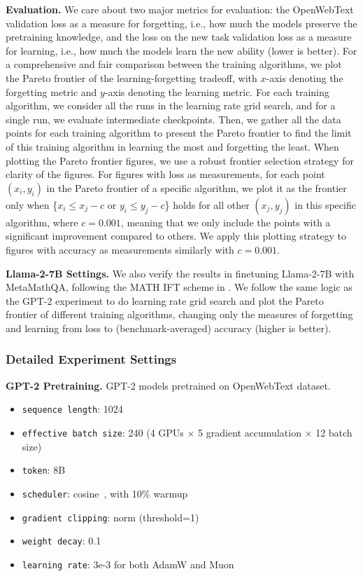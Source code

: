 \documentclass{article}
\theoremstyle{remark}
\begin{document}
\textbf{Evaluation.} We care about two major metrics for evaluation: the OpenWebText validation loss as a measure for forgetting, i.e., how much the models preserve the pretraining knowledge, and the loss on the new task validation loss as a measure for learning, i.e., how much the models learn the new ability (lower is better). 
For a comprehensive and fair comparison between the training algorithms, we plot the Pareto frontier of the learning-forgetting tradeoff, with $x$-axis denoting the forgetting metric and $y$-axis denoting the learning metric. 
For each training algorithm, we consider all the runs in the learning rate grid search, and for a single run, we evaluate intermediate checkpoints. Then, we gather all the data points for each training algorithm to present the Pareto frontier to find the limit of this training algorithm in learning the most and forgetting the least.
When plotting the Pareto frontier figures, we use a robust frontier selection strategy for clarity of the figures. For figures with loss as measurements, for each point $(x_i,y_i)$ in the Pareto frontier of a specific algorithm, we plot it as the frontier only when 
\{$x_i \le x_j - c$ or $y_i \le y_j - c$\}
holds for all other $(x_j,y_j)$ in this specific algorithm, where $c=0.001$, meaning that we only include the points with a significant improvement compared to others. We apply this plotting strategy to figures with accuracy as measurements similarly with $c=0.001$.

\textbf{Llama-2-7B Settings.} 
We also verify the results in finetuning Llama-2-7B with MetaMathQA, following the MATH IFT scheme in \citet{biderman2024lora}.
We follow the same logic as the GPT-2 experiment to do learning rate grid search and plot the Pareto frontier of different training algorithms, changing only the measures of forgetting and learning from loss to (benchmark-averaged) accuracy (higher is better). 

\subsubsection{Detailed Experiment Settings}\label{appendix:detailed_experiment_settings}

\textbf{GPT-2 Pretraining.} GPT-2 models pretrained on OpenWebText dataset.
\begin{itemize}
    \item \texttt{sequence length}: 1024
    \item \texttt{effective batch size}: 240 (4 GPUs $\times$ 5 gradient accumulation $\times$ 12 batch size)
    \item \texttt{token}: 8B
    \item \texttt{scheduler}: cosine~\citep{loshchilov2016sgdr}, with 10\% warmup
    \item \texttt{gradient clipping}: norm (threshold=1)
    \item \texttt{weight decay}: 0.1
    \item \texttt{learning rate}: 3e-3 for both AdamW and Muon
    
\end{itemize}
\end{document}
